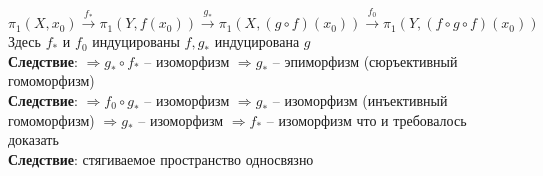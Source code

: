 	${\pi}_1 (X,x_0) \overset{f_*}{\rightarrow} {\pi}_1 (Y,f(x_0)) \overset{g_*}{\rightarrow} {\pi}_1 (X,(g \circ f)(x_0)) \overset{f_0}{\rightarrow} {\pi}_1 (Y,(f \circ g \circ f)(x_0))$\\
	Здесь $f_*$ и $f_0$ индуцированы $f, g_*$ индуцирована $g$\\
	\textbf{Следствие}: $\Rightarrow g_* \circ f_*$ -- изоморфизм $\Rightarrow g_*$ -- эпиморфизм (сюръективный гомоморфизм)\\
	\textbf{Следствие}: $\Rightarrow f_0 \circ g_*$ -- изоморфизм $\Rightarrow g_*$ -- изоморфизм (инъективный гомоморфизм)
	$\Rightarrow g_*$ -- изоморфизм $\Rightarrow f_*$ -- изоморфизм что и требовалось доказать\\
	\textbf{Следствие}: стягиваемое пространство односвязно
	


\newpage
